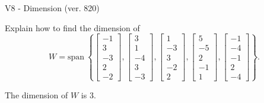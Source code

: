 \begin{exercise}
  \begin{exerciseTitle}V8 - Dimension (ver. 820)\end{exerciseTitle}
  \begin{exerciseStatement}
    Explain how to find the dimension of 
\[W=\mathrm{span}\ \left\{\left[\begin{array}{r}
-1 \\
3 \\
-3 \\
2 \\
-2
\end{array}\right] , \left[\begin{array}{r}
3 \\
1 \\
-4 \\
3 \\
-3
\end{array}\right] , \left[\begin{array}{r}
1 \\
-3 \\
3 \\
-2 \\
2
\end{array}\right] , \left[\begin{array}{r}
5 \\
-5 \\
2 \\
-1 \\
1
\end{array}\right] , \left[\begin{array}{r}
-1 \\
-4 \\
-1 \\
2 \\
-4
\end{array}\right]\right\}.\]



  \end{exerciseStatement}
  \begin{exerciseAnswer}
   The dimension of \(W\) is  \(3\).
  


  \end{exerciseAnswer}
\end{exercise}